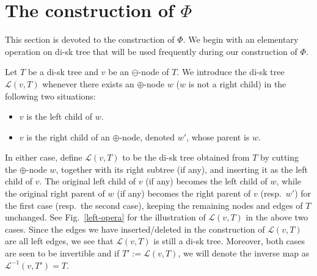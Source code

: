 \documentclass[12pt]{amsart}
\numberwithin{equation}{section}
\theoremstyle{plain}
\theoremstyle{definition}
\begin{document}
\section{The construction of \texorpdfstring{$\Phi$}{Phi}}\label{sec:constr of phi}

This section is devoted to the construction of $\Phi$. We begin with an elementary operation on di-sk tree that will be used frequently during our construction of $\Phi$. 

Let $T$ be a di-sk tree and $v$ be an $\ominus$-node of $T$. We introduce the di-sk tree $\mathcal{L}(v,T)$ whenever  there exists an $\oplus$-node $w$ ($w$ is not a right child) in the following two situations: 
\begin{itemize}
\item $v$ is the left child of $w$. 
\item $v$ is the right child of an $\oplus$-node, denoted $w'$, whose parent is $w$. 
\end{itemize}
In either case, define $\mathcal{L}(v,T)$ to be the di-sk tree obtained from $T$ by cutting the $\oplus$-node $w$, together with its right subtree (if any), and inserting it as the left child of $v$. The original left child of $v$ (if any) becomes the left child of $w$, while the original right parent of $w$ (if any) becomes the right parent of $v$ (resp.~$w'$) for the first case (resp.~the second case), keeping the remaining nodes and edges of $T$ unchanged. See Fig.~\ref{left-opera} for the illustration of $\mathcal{L}(v,T)$ in the above two cases. Since the edges we have inserted/deleted in the construction of $\mathcal{L}(v,T)$ are all left edges, we see that $\mathcal{L}(v,T)$ is still a di-sk tree. Moreover, both cases are seen to be invertible and if $T':=\mathcal{L}(v,T)$, we will denote the inverse map as $\mathcal{L}^{-1}(v,T')=T$.
\end{document}
